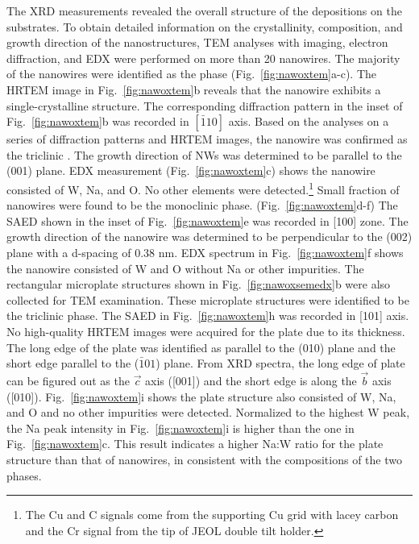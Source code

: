 The XRD measurements revealed the overall structure of the depositions on the substrates. To obtain detailed information on the crystallinity, composition, and growth direction of the nanostructures, TEM analyses with imaging, electron diffraction, and EDX were performed on more than 20 nanowires. The majority of the nanowires were identified as the  phase (Fig.~\ref{fig:nawoxtem}a-c). The HRTEM image in Fig.~\ref{fig:nawoxtem}b reveals that the nanowire exhibits a single-crystalline structure. The corresponding diffraction pattern in the inset of Fig.~\ref{fig:nawoxtem}b was recorded in $[\bar{1}10]$ axis. Based on the analyses on a series of diffraction patterns and HRTEM images, the nanowire was confirmed as the triclinic . The growth direction of  NWs was determined to be parallel to the (001) plane. EDX measurement (Fig.~\ref{fig:nawoxtem}c) shows the nanowire consisted of W, Na, and O. No other elements were detected.\footnote{The Cu and C signals come from the supporting Cu grid with lacey carbon and the Cr signal from the tip of JEOL double tilt holder.} Small fraction of nanowires were found to be the monoclinic  phase. (Fig.~\ref{fig:nawoxtem}d-f) The SAED shown in the inset of Fig.~\ref{fig:nawoxtem}e was recorded in [100] zone. The growth direction of the  nanowire was determined to be perpendicular to the (002) plane with a d-spacing of 0.38 nm. EDX spectrum in Fig.~\ref{fig:nawoxtem}f shows the nanowire consisted of W and O without Na or other impurities. The rectangular microplate structures shown in Fig.~\ref{fig:nawoxsemedx}b were also collected for TEM examination. These microplate structures were identified to be the triclinic  phase. The SAED in Fig.~\ref{fig:nawoxtem}h was recorded in [101] axis. No high-quality HRTEM images were acquired for the  plate due to its thickness. The long edge of the plate was identified as parallel to the (010) plane and the short edge parallel to the ($\bar{1}01$) plane. From XRD spectra, the long edge of  plate can be figured out as the $\vec{c}$ axis ([001]) and the short edge is along the $\vec{b}$ axis ([010]). Fig.~\ref{fig:nawoxtem}i shows the plate structure also consisted of W, Na, and O and no other impurities were detected. Normalized to the highest W peak, the Na peak intensity in Fig.~\ref{fig:nawoxtem}i is higher than the one in Fig.~\ref{fig:nawoxtem}c. This result indicates a higher Na:W ratio for the  plate structure than that of  nanowires, in consistent with the compositions of the two phases.

